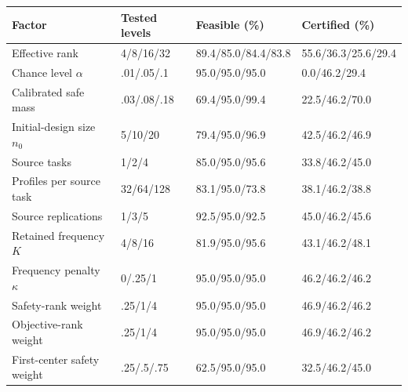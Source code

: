 \begin{tabular}{llll}
\toprule
Factor & Tested levels & Feasible (\%) & Certified (\%) \\
\midrule
Effective rank & 4/8/16/32 & 89.4/85.0/84.4/83.8 & 55.6/36.3/25.6/29.4 \\
Chance level $\alpha$ & .01/.05/.1 & 95.0/95.0/95.0 & 0.0/46.2/29.4 \\
Calibrated safe mass & .03/.08/.18 & 69.4/95.0/99.4 & 22.5/46.2/70.0 \\
Initial-design size $n_0$ & 5/10/20 & 79.4/95.0/96.9 & 42.5/46.2/46.9 \\
Source tasks & 1/2/4 & 85.0/95.0/95.6 & 33.8/46.2/45.0 \\
Profiles per source task & 32/64/128 & 83.1/95.0/73.8 & 38.1/46.2/38.8 \\
Source replications & 1/3/5 & 92.5/95.0/92.5 & 45.0/46.2/45.6 \\
Retained frequency $K$ & 4/8/16 & 81.9/95.0/95.6 & 43.1/46.2/48.1 \\
Frequency penalty $\kappa$ & 0/.25/1 & 95.0/95.0/95.0 & 46.2/46.2/46.2 \\
Safety-rank weight & .25/1/4 & 95.0/95.0/95.0 & 46.9/46.2/46.2 \\
Objective-rank weight & .25/1/4 & 95.0/95.0/95.0 & 46.9/46.2/46.2 \\
First-center safety weight & .25/.5/.75 & 62.5/95.0/95.0 & 32.5/46.2/45.0 \\
\bottomrule
\end{tabular}
